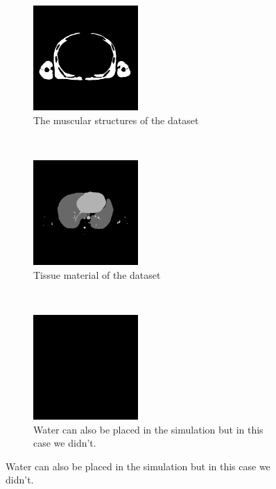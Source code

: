 \begin{figure}[h!]
	\begin{subfigure}[h]{0.3\textwidth}
		\centering
		\includegraphics[height=4cm]{images/KoreanMuscle.png}
		\caption{The muscular structures of the dataset\\}
		\label{korean4}
	\end{subfigure}%
	~
	\begin{subfigure}[h]{0.3\textwidth}
		\centering
		\includegraphics[height=4cm]{images/KoreanTissue.png}
		\caption{Tissue material of the dataset\\}
		\label{korean5}
	\end{subfigure}%
	~
	\begin{subfigure}[h]{0.3\textwidth}
		\centering
		\includegraphics[height=4cm]{images/KoreanWater.png}
		\caption{Water can also be placed in the simulation but in this case we didn't.}
		\label{korean6}
	\end{subfigure}%
\end{figure}
